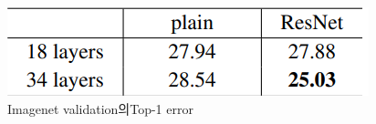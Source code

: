 \documentclass[extendedabs]{bmvc2k}
\begin{document}
\begin{figure}[t]
	\includegraphics[width=\linewidth]{images/resnetresult1.PNG}
	\caption{Imagenet validation의Top-1 error}
 \label{fig:plainresnetresult}
	\vspace{-2mm}
\end{figure}

\newpage

\end{document}
